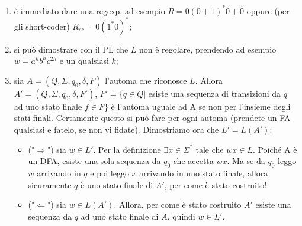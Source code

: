 \documentclass[a4paper,11pt]{article}
\begin{document}
\begin{enumerate}
    \item è immediato dare una regexp, ad esempio $R=0(0+1)^{*}0+0$ oppure (per gli short-coder) $R_{sc}=0(1^*0)^*$;
    \item si può dimostrare con il PL che $L$ non è regolare, prendendo ad esempio $w=a^hb^hc^{2h}$ e un qualsiasi $k$;
    \item sia $A=(Q,\Sigma, q_0, \delta, F)$ l'automa che riconosce $L$. Allora $A'=(Q, \Sigma ,q_0,\delta ,F')$, $F'=\{q\in Q|$ esiste una sequenza di transizioni da $q$ ad uno stato finale $f\in F \}$ è l'automa uguale ad A se non per l'insieme degli stati finali. Certamente questo si può fare per ogni automa (prendete un FA qualsiasi e fatelo, se non vi fidate). Dimostriamo ora che $L'=L(A')$:
    \begin{itemize}
        \item ("$\Rightarrow$") sia $w\in L'$. Per la definizione $\exists x \in \Sigma ^* $ tale che $wx\in L$. Poiché A è un DFA, esiste una sola sequenza da $q_0$ che accetta $wx$. Ma se da $q_0$ leggo $w$ arrivando in $q$ e poi leggo $x$ arrivando in uno stato finale, allora sicuramente $q$ è uno stato finale di $A'$, per come è stato costruito!
        \item ("$\Leftarrow$") sia $w\in L(A')$. Allora, per come è stato costruito $A'$ esiste una sequenza da $q$ ad uno stato finale di $A$, quindi $w \in L'$.
    \end{itemize}
\end{enumerate}

\begin{comment}
Si ha $L(G)=\{a^nb^m|n,m\in\mathbb{N},n+m\geq 1\}=L$. L'asserzione va dimostrata per induzione in entrambi i versi. Una traccia alla dimostrazione è la seguente:
\begin{enumerate}
    \item ("$\Rightarrow$")\\Caso base: 1 derivazione, cioè $S\Rightarrow a$ o $S\Rightarrow b$ entrambe apparteSnenti a $L$.\\Caso induttivo: $S\Rightarrow aS\Rightarrow ^{n}aw'$ o $S\Rightarrow bS\Rightarrow ^{n}bw'$, ma $w' \in L$ per ipotesi induttiva. Aggiungendo una $a$ all'inizio o una $b$ alla fine rimane comunque una stringa in $L$;
    \item ("$\Leftarrow$")\\Caso base: lunghezza 1, cioè $w=a$ o $w=b$. Naturalmente $L(G)$ contiene queste stringhe perché ci sono direttamente le produzioni che lo fanno.\\Caso induttivo: $|w|=n+1$. Allora $w=w'b$ o $w=aw'$. Per ipotesi induttiva $S=>^{*}w'$. Quindi: $S\Rightarrow aS\Rightarrow aw'=w$ o $S\Rightarrow bS\Rightarrow bw'=w \: \Rightarrow w\in L(G)$.
\end{enumerate}
\end{comment}
    
\end{document}
